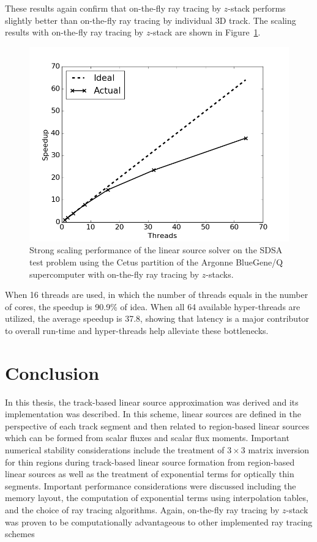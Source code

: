 These results again confirm that on-the-fly ray tracing by $z$-stack performs slightly better than on-the-fly ray tracing by individual 3D track. The scaling results with on-the-fly ray tracing by $z$-stack are shown in Figure~\ref{fig:rt-parallel-ls-cetus}. 

\begin{figure}[ht!]
	\centering
	\includegraphics[width=0.75\linewidth]{figures/results/performance/ls-parallel-scaling-stacks-cetus.png}
	\caption{Strong scaling performance of the linear source solver on the SDSA test problem using the Cetus partition of the Argonne BlueGene/Q supercomputer with on-the-fly ray tracing by $z$-stacks.}
	\label{fig:rt-parallel-ls-cetus}
\end{figure}

When 16 threads are used, in which the number of threads equals in the number of cores, the speedup is 90.9\% of idea. When all 64 available hyper-threads are utilized, the average speedup is 37.8, showing that latency is a major contributor to overall run-time and hyper-threads help alleviate these bottlenecks.

\section{Conclusion}
\label{sec:ls-conclusion}

In this thesis, the track-based linear source approximation was derived and its implementation was described. In this scheme, linear sources are defined in the perspective of each track segment and then related to region-based linear sources which can be formed from scalar fluxes and scalar flux moments. Important numerical stability considerations include the treatment of $3 \times 3$ matrix inversion for thin regions during track-based linear source formation from region-based linear sources as well as the treatment of exponential terms for optically thin segments. Important performance considerations were discussed including the memory layout, the computation of exponential terms using interpolation tables, and the choice of ray tracing algorithms. Again, on-the-fly ray tracing by $z$-stack was proven to be computationally advantageous to other implemented ray tracing schemes

